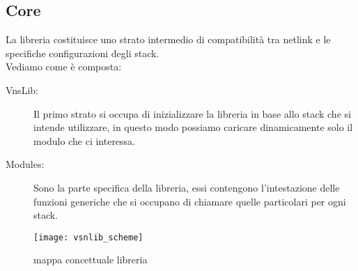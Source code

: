 \subsection{Core}
La libreria costituisce uno strato  intermedio di compatibilit\`a tra netlink e le specifiche configurazioni degli stack.\\
Vediamo come \`e composta:
\begin{description}                     %
  \item[VnsLib:] Il primo strato si occupa di inizializzare la libreria in base allo stack che si intende utilizzare, in questo modo possiamo caricare dinamicamente solo il modulo che ci interessa.
  \item[Modules:] Sono la parte specifica della libreria, essi contengono l'intestazione delle funzioni generiche che si occupano di chiamare quelle particolari per ogni stack.
\end{description}
\begin{figure}[h]                       %
\begin{center}                          %
\texttt{[image: vsnlib\_scheme]}%
%
\caption[mappa concettuale libreria]{mappa concettuale libreria}\label{fig:map}
\end{center}
\end{figure}
